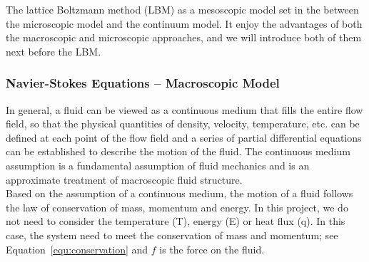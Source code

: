The lattice Boltzmann method (LBM) as a mesoscopic model set in the between the microscopic model and the continuum model. It enjoy the advantages of both the macroscopic and microscopic approaches, and we will introduce both of them next before the LBM.

\subsubsection{Navier-Stokes Equations -- Macroscopic Model} \label{sec:nse}
In general, a fluid can be viewed as a continuous medium that fills the entire flow field, so that the physical quantities of density, velocity, temperature, etc. can be defined at each point of the flow field and a series of partial differential equations can be established to describe the motion of the fluid. The continuous medium assumption is a fundamental assumption of fluid mechanics and is an approximate treatment of macroscopic fluid structure.\\

Based on the assumption of a continuous medium, the motion of a fluid follows the law of conservation of mass, momentum and energy. In this project, we do not need to consider the temperature (T), energy (E) or heat flux (q). In this case, the system need to meet the conservation of mass and momentum; see Equation~\ref{equ:conservation} and $f$ is the force on the fluid. 



